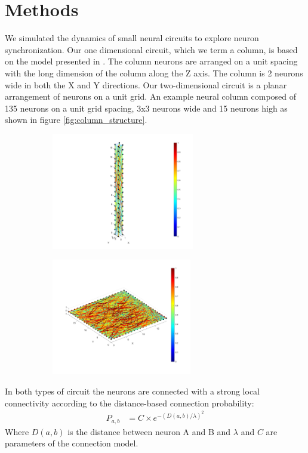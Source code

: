 \documentclass[a4paper,11pt]{article}
\begin{document}
\section{Methods}
We simulated the dynamics of small neural circuits to explore neuron synchronization.
Our one dimensional circuit, which we term a column, is based on the model presented in \cite{markram1998}.
The column neurons are arranged on a unit spacing with the long dimension of the column along the Z axis.
The column is 2 neurons wide in both the X and Y directions.
Our two-dimensional circuit is a planar arrangement of neurons on a unit grid.
An example neural column composed of 135 neurons on a unit grid spacing, 3x3 neurons wide and 15 neurons high as shown in figure \ref{fig:column_structure}.
\begin{figure}[!ht]
 \caption{ The left image shows a 1-D coumn structure, the right image shows a 2-D planar structure. The connections are color-coded by length.}
 \label{fig:column_structure}
 \centering
    \begin{subfigure}[b]{0.4\textwidth}
      \centering
      \includegraphics[height=2in]{fig/1D_Connection_Plot}
    \end{subfigure}
    \begin{subfigure}[b]{0.4\textwidth}
      \centering
      \includegraphics[height=2in]{fig/2D_Connection_Plot}
    \end{subfigure}
\end{figure}

In both types of circuit the neurons are connected with a strong local connectivity according to the distance-based connection probability:
\begin{align}\label{eq:connectivity}
 P_{a,b} &= C \times e^{-(D(a,b)/\lambda)^2}
\end{align}
Where $D(a,b)$ is the distance between neuron A and B and $\lambda$ and $C$ are parameters of the connection model.
\end{document}
